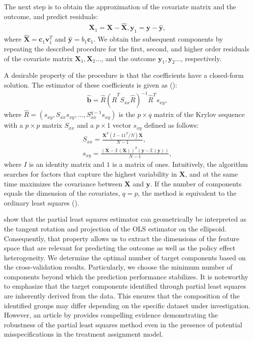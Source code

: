 \documentclass[12pt]{article}
\begin{document}
The next step is to obtain the approximation of the covariate matrix and the outcome, and predict residuals:
\begin{align}
    \mathbf{X}_1 = \mathbf{X} - \hat{\mathbf{X}},
    \mathbf{y}_1 = \mathbf{y} - \hat{\mathbf{y}},
\end{align}
where $ \hat{\mathbf{X}} = \mathbf{c}_1\mathbf{v}_1^T$ and $\hat{\mathbf{y}} = b_1\mathbf{c}_1$. We obtain the subsequent components by repeating the described procedure for the first, second, and higher order residuals of the covariate matrix $\mathbf{X}_1, \mathbf{X}_2 \dots$, and the outcome $\mathbf{y}_1, \mathbf{y}_2 \dots$, respectively.

A desirable property of the procedure is that the coefficients have a closed-form solution. The estimator of these coefficients is given as (\citealp{helland1990partial, stone1990continuum}):
\begin{align} \label{eq_pls_coe}
    \widehat{\mathbf{b}} = \hat{R}(\hat{R}^TS_{xx}\hat{R})^{-1}\hat{R}^Ts_{xy},
\end{align} 
where $\hat{R} = (s_{xy}, S_{xx}s_{xy}, \dots, S_{xx}^{q-1}s_{xy})$ is the $p \times q$ matrix of the Krylov sequence with a $p \times p$ matrix $S_{xx}$  and a $p \times 1$ vector $s_{xy}$ defined as follows:
\begin{align*}
    S_{xx} = \frac{\mathbf{X}^T(I - 11^T/N)\mathbf{X}}{N-1}, \\
    s_{xy} =  \frac{(\mathbf{X} - \mathbb{E}(\mathbf{X}))^T( \mathbf{y} - \mathbb{E}(\mathbf{y}))}{N-1},
\end{align*}
where $I$ is an identity matrix and $1$ is a matrix of ones. Intuitively, the algorithm searches for factors  that capture the highest variability in $\mathbf{X}$, and at the same time maximizes the covariance between $\mathbf{X}$ and $\mathbf{y}$. If the number of components equals the dimension of the covariates, $q = p$, the method is equivalent to the ordinary least squares (\citealp{helland1990partial}). 

\cite{phatak1997geometry} show that the partial least squares estimator can geometrically be interpreted as the tangent rotation and projection of the OLS estimator on the ellipsoid. Consequently, that property allows us to extract the dimensions of the feature space that are relevant for predicting the outcome as well as the policy effect heterogeneity.  
We determine the optimal number of target components based on the cross-validation results. Particularly, we choose the minimum number of components  beyond which the prediction performance stabilizes. It is noteworthy to emphasize that the target components identified through partial least squares are inherently derived from the data. This ensures that the composition of the identified groups may differ depending on the specific dataset under investigation. However, an article by \cite{cao2018partial} provides compelling evidence demonstrating the robustness of the partial least squares method even in the presence of potential misspecifications in the treatment assignment model.
\end{document}
